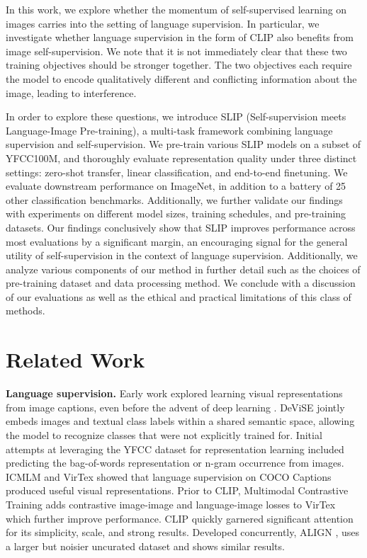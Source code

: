 \documentclass[10pt,twocolumn,letterpaper]{article}
\renewcommand{\paragraph}[1]{\vspace{1.25mm}\noindent\textbf{#1}}
\begin{document}
In this work, we explore whether the momentum of self-supervised learning on images carries into the setting of language supervision.
In particular, we investigate whether language supervision in the form of CLIP also benefits from image self-supervision.
We note that it is not immediately clear that these two training objectives should be stronger together.
The two objectives each require the model to encode qualitatively different and conflicting information about the image, leading to interference.

In order to explore these questions, we introduce SLIP (Self-supervision meets Language-Image Pre-training), a multi-task framework combining language supervision and self-supervision.
We pre-train various SLIP models on a subset of YFCC100M, and thoroughly evaluate representation quality under three distinct settings: zero-shot transfer, linear classification, and end-to-end finetuning. 
We evaluate downstream performance on ImageNet, in addition to a battery of 25 other classification benchmarks.
Additionally, we further validate our findings with experiments on different model sizes, training schedules, and pre-training datasets.
Our findings conclusively show that SLIP improves performance across most evaluations by a significant margin, an encouraging signal for the general utility of self-supervision in the context of language supervision.
Additionally, we analyze various components of our method in further detail such as the choices of pre-training dataset and data processing method.
We conclude with a discussion of our evaluations as well as the ethical and practical limitations of this class of methods.

\section{Related Work}

\paragraph{Language supervision.}
Early work explored learning visual representations from image captions, even before the advent of deep learning \cite{Quattoni2007LearningVR}.
DeViSE \cite{Frome2013DeViSEAD} jointly embeds images and textual class labels within a shared semantic space, allowing the model to recognize classes that were not explicitly trained for.
Initial attempts at leveraging the YFCC dataset for representation learning included predicting the bag-of-words representation \cite{Joulin2016LearningVF} or n-gram occurrence \cite{Li2017LearningVN} from images.
ICMLM \cite{Sariyildiz2020LearningVR} and VirTex \cite{Desai2021VirTexLV} showed that language supervision on COCO Captions produced useful visual representations.
Prior to CLIP, Multimodal Contrastive Training \cite{Yuan2021MultimodalCT} adds contrastive image-image and language-image losses to VirTex which further improve performance.
CLIP \cite{Radford2021LearningTV} quickly garnered significant attention for its simplicity, scale, and strong results.
Developed concurrently, ALIGN \cite{Jia2021ScalingUV}, uses a larger but noisier uncurated dataset and shows similar results.
\end{document}

